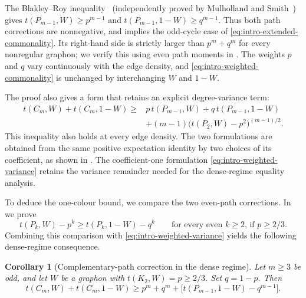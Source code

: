 \documentclass[11pt]{article}
\newtheorem{corollary}[theorem]{Corollary}
\numberwithin{equation}{section}
\newcommand{\tC}[2]{t(C_{#1},#2)}
\newcommand{\tP}[2]{t(P_{#1},#2)}
\newcommand{\edens}[1]{t(K_{2},#1)}
\begin{document}
The Blakley--Roy inequality~\cite{blakley1965holder} (independently
proved by Mulholland and Smith~\cite{mulholland1959inequality}) gives
$\tP{m-1}W\ge p^{m-1}$ and
$\tP{m-1}{1-W}\ge q^{m-1}$. Thus both path corrections are
nonnegative, and  implies the
odd-cycle case of \eqref{eq:intro-extended-commonality}. Its right-hand
side is strictly larger than $p^m+q^m$ for every nonregular graphon;
we verify this using even path moments in .
The weights $p$ and $q$ vary continuously with the edge density, and
\eqref{eq:intro-weighted-commonality} is unchanged by interchanging
$W$ and $1-W$.

The proof also gives a form that retains an explicit degree-variance
term:
\begin{equation}\label{eq:intro-weighted-variance}
  \begin{aligned}
    \tC mW+\tC m{1-W}\ge{}&
      p\,\tP{m-1}W+q\,\tP{m-1}{1-W}\\
      &+(m-1)\bigl(\tP2W-p^2\bigr)^{(m-1)/2}.
  \end{aligned}
\end{equation}
This inequality also holds at every edge density. The two formulations
are obtained from the same positive expectation identity by two
choices of its coefficient, as shown in
. The coefficient-one formulation
\eqref{eq:intro-weighted-variance} retains the variance remainder
needed for the dense-regime equality analysis.

To deduce the one-colour bound, we compare the two even-path
corrections. In  we prove
\begin{equation}\label{eq:intro-path-comparison}
  \tP kW-p^k\ge\tP k{1-W}-q^k
  \qquad\text{for every even $k\ge2$, if $p\ge2/3$.}
\end{equation}
Combining this comparison with
\eqref{eq:intro-weighted-variance} yields the following dense-regime
consequence.

\begin{corollary}[Complementary-path correction in the dense regime]
\label{thm:commonality}
  Let $m\ge3$ be odd, and let $W$ be a graphon with
  $\edens W=p\ge2/3$. Set $q=1-p$. Then
  \begin{equation}\label{eq:intro-commonality}
    \tC mW+\tC m{1-W}\ge p^m+q^m+
       \bigl[\tP{m-1}{1-W}-q^{m-1}\bigr].
  \end{equation}
\end{corollary}
\end{document}
